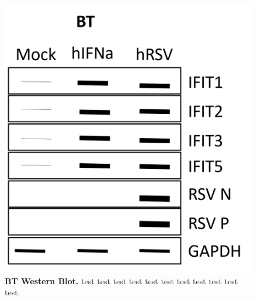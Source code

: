 \begin{figure}
    \centering
    \includegraphics[width=0.5\linewidth]{07. Chapter 2/Figs/03. Expression/03. bt wb.png}
    \caption[BT Western Blot.]{\textbf{BT Western Blot.} test test test test test test test test test test test.}
    \label{BT Western Blot.}
\end{figure}
